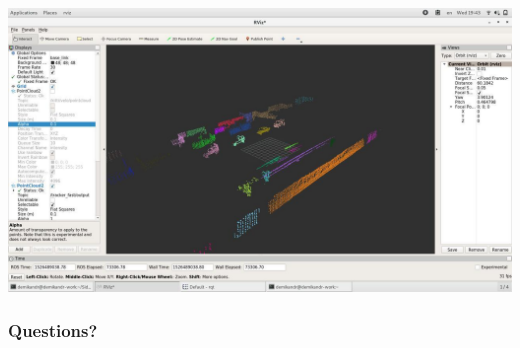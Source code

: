 \documentclass[xcolor=table,usenames,dvipsnames]{beamer}
\begin{document}
\begin{frame}
\includegraphics[width=\textwidth]{img/ya_my_sample.jpg}
\end{frame}
\begin{frame}
\frametitle{Questions?}

\end{frame}
\end{document}
